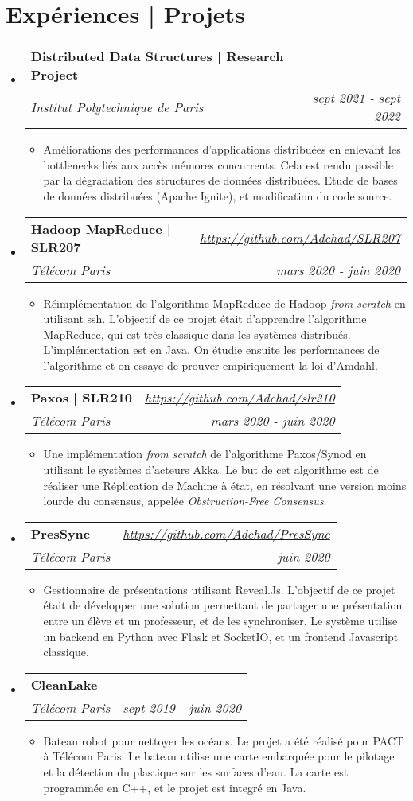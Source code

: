 \documentclass[a4paper,20pt]{article}
\makeatletter
\newcommand{\resumeItemWithoutTitle}[1]{
  \item\small{
    {\vspace{-2pt}#1}
  }
}
\newcommand{\resumeSubheading}[4]{
  \vspace{-1pt}\item
    \begin{tabular*}{0.97\textwidth}{l@{\extracolsep{\fill}}r}
      \textbf{#1} & #2 \\
      \textit{#3} & \textit{#4} \\
    \end{tabular*}\vspace{-5pt}
}
\newcommand{\resumeSubHeadingListStart}{\begin{itemize}[leftmargin=*]}
\newcommand{\resumeSubHeadingListEnd}{\end{itemize}}
\newcommand{\resumeItemListStart}{\begin{itemize}}
\newcommand{\resumeItemListEnd}{\end{itemize}\vspace{-5pt}}
\makeatother
\begin{document}
\section{Expériences | Projets}
 \resumeSubHeadingListStart
  \resumeSubheading
  {Distributed Data Structures | Research Project}{ }
  {Institut Polytechnique de Paris}{sept 2021 - sept 2022}
   \resumeItemListStart 
    \resumeItemWithoutTitle
    {Améliorations des performances d'applications distribuées en enlevant les bottlenecks liés aux accès mémores concurrents. Cela est rendu possible par la dégradation des structures de données distribuées. Etude de bases de données distribuées (Apache Ignite), et modification du code source. }
   \resumeItemListEnd 
  \resumeSubheading
  {Hadoop MapReduce | SLR207}{\textit{\href{https://github.com/Adchad/SLR207}{https://github.com/Adchad/SLR207}}}
  {Télécom Paris}{mars 2020 - juin 2020 }
   \resumeItemListStart 
    \resumeItemWithoutTitle
    {Réimplémentation de l'algorithme MapReduce de Hadoop \textit{from scratch} en utilisant ssh. L'objectif de ce projet était d'apprendre l'algorithme MapReduce, qui est très classique dans les systèmes distribués. L'implémentation est en Java. On étudie ensuite les performances de l'algorithme et on essaye de prouver empiriquement la loi d'Amdahl.}
   \resumeItemListEnd 
  \resumeSubheading
  {Paxos | SLR210}{\textit{\href{https://github.com/Adchad/slr210}{https://github.com/Adchad/slr210}}}
  {Télécom Paris}{mars 2020 - juin 2020 }
   \resumeItemListStart 
    \resumeItemWithoutTitle
    {Une implémentation \textit{from scratch} de l'algorithme Paxos/Synod en utilisant le systèmes d'acteurs Akka. Le but de cet algorithme est de réaliser une Réplication de Machine à état, en résolvant une version moins lourde du consensus, appelée \textit{Obstruction-Free Consensus}.}
   \resumeItemListEnd 
  \resumeSubheading
  {PresSync}{\textit{\href{https://github.com/Adchad/PresSync}{https://github.com/Adchad/PresSync}}}
  {Télécom Paris}{juin 2020}
   \resumeItemListStart 
    \resumeItemWithoutTitle
    {Gestionnaire de présentations utilisant Reveal.Js. L'objectif de ce projet était de développer une solution permettant de partager une présentation entre un élève et un professeur, et de les synchroniser. Le système utilise un backend en Python avec Flask et SocketIO, et un frontend Javascript classique.}
   \resumeItemListEnd 
  \resumeSubheading
  {CleanLake}{ }
  {Télécom Paris}{sept 2019 - juin 2020}
   \resumeItemListStart 
    \resumeItemWithoutTitle
    {Bateau robot pour nettoyer les océans. Le projet a été réalisé pour PACT à Télécom Paris. Le bateau utilise une carte embarquée pour le pilotage et la détection du plastique sur les surfaces d'eau. La carte est programmée en C++, et le projet est integré en Java.}
   \resumeItemListEnd 
 \resumeSubHeadingListEnd
\end{document}
